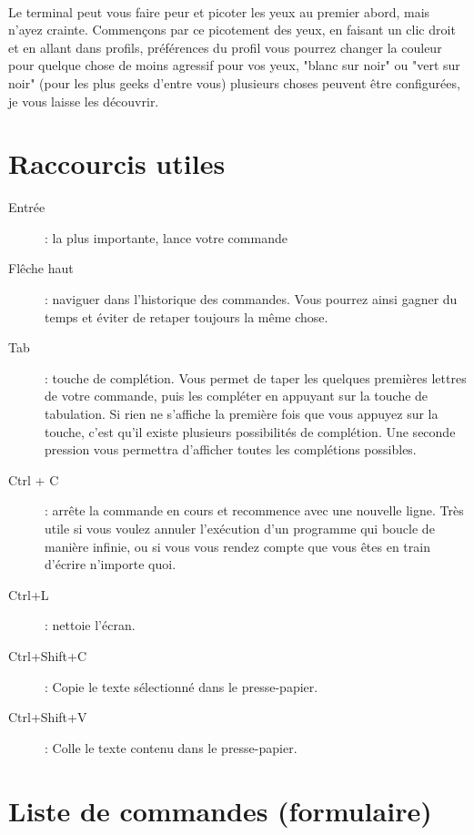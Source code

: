 \documentclass[french, a4paper, 12pt, titlepage]{article}
\begin{document}
\paragraph{} Le terminal peut vous faire peur et picoter les yeux au premier
abord, mais n'ayez crainte. Commençons par ce picotement des yeux,
en faisant un clic droit et en allant dans profils, préférences du profil vous
pourrez changer la couleur pour quelque chose de moins agressif pour vos yeux,
"blanc sur noir" ou "vert sur noir" (pour les plus geeks d'entre vous)
plusieurs choses peuvent être configurées, je vous laisse les découvrir.

\section{Raccourcis utiles}

\begin{description}
	\item[Entrée]: la plus importante, lance votre commande
	\item[Flêche haut]: naviguer dans l'historique des commandes. Vous pourrez
		ainsi gagner du temps et éviter de retaper toujours la même chose.
	\item[Tab]: touche de complétion. Vous permet de taper les quelques
		premières lettres de votre commande, puis les compléter en appuyant sur
		la touche de tabulation. Si rien ne s'affiche la première fois que vous
		appuyez sur la touche, c'est qu'il existe plusieurs possibilités de
		complétion. Une seconde pression vous permettra d'afficher toutes les
		complétions possibles.
	\item[Ctrl + C]: arrête la commande en cours et recommence avec une
		nouvelle ligne. Très utile si vous voulez annuler l'exécution d'un
		programme qui boucle de manière infinie, ou si vous vous rendez compte
		que vous êtes en train d'écrire n'importe quoi.
	\item[Ctrl+L]: nettoie l'écran.
	\item[Ctrl+Shift+C]: Copie le texte sélectionné dans le presse-papier.
	\item[Ctrl+Shift+V]: Colle le texte contenu dans le presse-papier.
\end{description}

\section{Liste de commandes (formulaire)}
\end{document}
